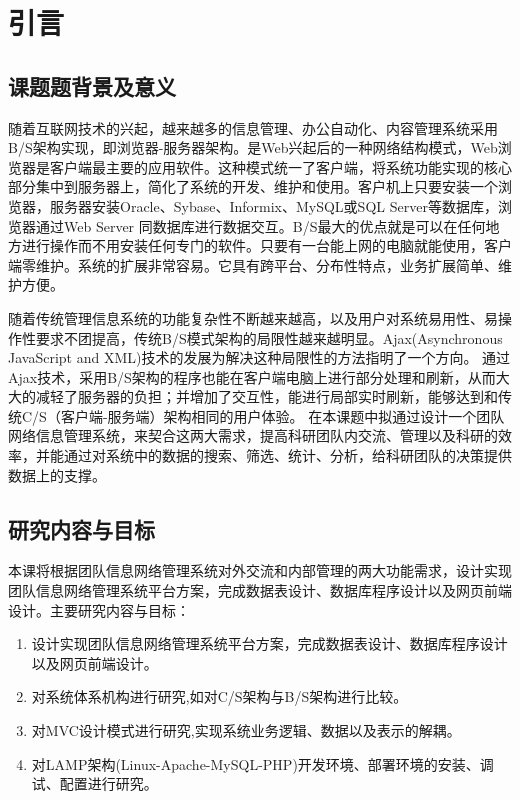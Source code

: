 
\chapter{引言}
\section{课题题背景及意义}
随着互联网技术的兴起，越来越多的信息管理、办公自动化、内容管理系统采用B/S架构实现，即浏览器-服务器架构。是Web兴起后的一种网络结构模式，Web浏览器是客户端最主要的应用软件。这种模式统一了客户端，将系统功能实现的核心部分集中到服务器上，简化了系统的开发、维护和使用。客户机上只要安装一个浏览器，服务器安装Oracle、Sybase、Informix、MySQL或SQL Server等数据库，浏览器通过Web Server 同数据库进行数据交互。B/S最大的优点就是可以在任何地方进行操作而不用安装任何专门的软件。只要有一台能上网的电脑就能使用，客户端零维护。系统的扩展非常容易。它具有跨平台、分布性特点，业务扩展简单、维护方便。

随着传统管理信息系统的功能复杂性不断越来越高，以及用户对系统易用性、易操作性要求不团提高，传统B/S模式架构的局限性越来越明显。Ajax(Asynchronous JavaScript and XML)技术的发展为解决这种局限性的方法指明了一个方向。
通过Ajax技术，采用B/S架构的程序也能在客户端电脑上进行部分处理和刷新，从而大大的减轻了服务器的负担；并增加了交互性，能进行局部实时刷新，能够达到和传统C/S（客户端-服务端）架构相同的用户体验。
在本课题中拟通过设计一个团队网络信息管理系统，来契合这两大需求，提高科研团队内交流、管理以及科研的效率，并能通过对系统中的数据的搜索、筛选、统计、分析，给科研团队的决策提供数据上的支撑。

\section{研究内容与目标}

本课将根据团队信息网络管理系统对外交流和内部管理的两大功能需求，设计实现团队信息网络管理系统平台方案，完成数据表设计、数据库程序设计以及网页前端设计。主要研究内容与目标：
\begin{enumerate}
\item 设计实现团队信息网络管理系统平台方案，完成数据表设计、数据库程序设计以及网页前端设计。
\item 对系统体系机构进行研究,如对C/S架构与B/S架构进行比较。
\item 对MVC设计模式进行研究,实现系统业务逻辑、数据以及表示的解耦。
\item 对LAMP架构(Linux-Apache-MySQL-PHP)开发环境、部署环境的安装、调试、配置进行研究。
\end{enumerate}

